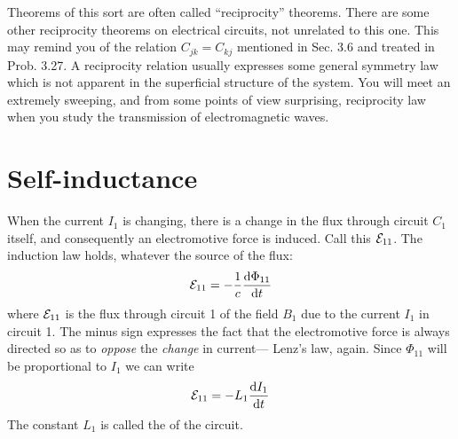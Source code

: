 Theorems of this sort are often called ``reciprocity'' theorems.
There are some other reciprocity theorems on electrical circuits, not
unrelated to this one. This may remind you of the relation $C_{jk} = C_{kj}$
mentioned in Sec. 3.6 and treated in Prob. 3.27. A reciprocity relation
usually expresses some general symmetry law which is not apparent
in the superficial structure of the system. You will meet an
extremely sweeping, and from some points of view surprising,
reciprocity law when you study the transmission of electromagnetic
waves.

\section{Self-inductance}
When the current $I_1$ is changing, there is a change in the flux
through circuit $C_1$ itself, and consequently an electromotive force is induced.
Call this $\mathcal{E}_{11}$. The induction law holds, whatever the source
of the flux:
\begin{equation}
  \mathcal{E}_{11} = -\frac{1}{c} \frac{\textup{d}\Phi_{11}}{\textup{d} t}
\end{equation}
where $\mathcal{E}_{11}$ is the flux through circuit 1 of the field $B_1$ due to the current
$I_1$ in circuit 1. The minus sign expresses the fact that the electromotive
force is always directed so as to \emph{oppose} the \emph{change} in current---
Lenz's law, again. Since $\Phi_{11}$ will be proportional to $I_1$ we can write
\begin{equation}
  \mathcal{E}_{11} = -L_1 \frac{\textup{d} I_1}{\textup{d} t}
\end{equation}
The constant $L_1$ is called the  of the circuit.

